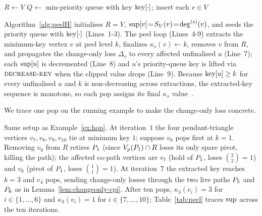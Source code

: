 \begin{algorithm}[t]
\algfontsize
\caption{\spinStar{}: change-only peeling over set support.}
\label{alg:peelH}

$R\gets V$\;
$Q\gets$ min-priority queue with key $\mathrm{key}[\cdot]$; insert each $v\in V$\;
\end{algorithm}

Algorithm~\ref{alg:peelH} initialises $R\!=\!V$, $\mathrm{sup}[v]\!=\!S_V(v)\!=\!\deg^{(s)}(v)$, and seeds the priority queue with $\mathrm{key}[\cdot]$ (Lines~1-3).
%
The peel loop (Lines~4-9) extracts the minimum-key vertex $v$ at peel level $k$, finalizes $\kappa_s(v)\!\gets\!k$, removes $v$ from $R$, and propagates the change-only loss $\Delta_v$ to every affected unfinalised $u$ (Line~7); each $\mathrm{sup}[u]$ is decremented (Line~8) and $u$'s priority-queue key is lifted via $\textsc{decrease-key}$ when the clipped value drops (Line~9).
%
Because $\mathrm{key}[u]\ge k$ for every unfinalised $u$ and $k$ is non-decreasing across extractions, the extracted-key sequence is monotone, so each pop assigns its final $\kappa_s$ value~\cite{coreAlg}.

We trace one pop on the running example to make the change-only loss concrete.

\begin{example}\label{ex:peelh}
Same setup as Example~\ref{ex:hop}.
%
At iteration~$1$ the four pendant-triangle vertices $v_7,v_8,v_9,v_{10}$ tie at minimum key $1$; suppose $v_8$ pops first at $k\!=\!1$.
%
Removing $v_8$ from $R$ retires $\TPath_1$ (since $\Vp(\TPath_1)\cap R$ loses its only spare pivot, killing the path); the affected co-path vertices are $v_7$ (hold of $\TPath_1$, loses $\binom{2}{2}\!=\!1$) and $v_6$ (pivot of $\TPath_1$, loses $\binom{1}{1}\!=\!1$).
%
At iteration~$7$ the extracted key reaches $k\!=\!3$ and $v_4$ pops, sending change-only losses through the two live paths $\TPath_5$ and $\TPath_6$ as in Lemma~\ref{lem:changeonly-cpi}.
%
After ten pops, $\kappa_3(v_i)\!=\!3$ for $i\!\in\!\{1,\ldots,6\}$ and $\kappa_3(v_i)\!=\!1$ for $i\!\in\!\{7,\ldots,10\}$; Table~\ref{tab:peel} traces $\mathrm{sup}$ across the ten iterations.
\end{example}

